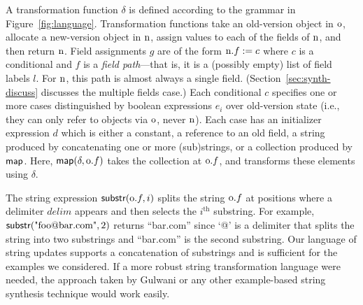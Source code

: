 \documentclass[natbib,10pt]{sigplanconf}
\begin{document}
A transformation function $\delta$ is defined according to the grammar in
Figure~\ref{fig:language}.  Transformation functions take an old-version
object in $\textrm{o}$, allocate a new-version object in $\textrm{n}$,
assign values to each of the fields of $\textrm{n}$, and then return
$\textrm{n}$.  Field assignments $g$ are of the form $\textrm{n}.f := c$
where $c$ is a conditional and $f$ is a \emph{field path}---that is,
it is a (possibly empty) list of field labels $l$.  For $\textrm{n}$, this
path is almost always a single field. (Section~\ref{sec:synth-discuss}
discusses the multiple fields case.)  Each conditional $c$
specifies one or more cases distinguished by boolean expressions $e_i$
over old-version state (i.e., they can only refer to objects via
$\textrm{o}$, never $\textrm{n}$).  Each case has an initializer expression
$d$ which is either a constant, a reference to an old field, a string
produced by concatenating one or more (sub)strings, or a collection
produced by $\textsf{map}$. Here, $\textsf{map}(\delta,\textrm{o}.f)$ takes the collection at
$\textrm{o}.f$, and 
transforms these elements using $\delta$.  

The string expression
$\textsf{substr}(\textrm{o}.f,i)$ splits the string $\textrm{o}.f$ at positions
where a delimiter $\mathit{delim}$ appears and then selects the
$i^\text{th}$ substring.
For example, $\textsf{substr}(\text{"foo@bar.com"},2)$ returns
``bar.com'' since `@' is a delimiter that splits the string into two substrings
and ``bar.com'' is the second substring.  Our language of
string updates supports a concatenation of substrings and is
sufficient for the examples we considered.  If a more robust string
transformation language were needed, the approach taken by Gulwani
\cite{Gulwani:popl:2011,Gulwani:pldi:2011} or any other example-based
string synthesis technique would work easily.

\end{document}
